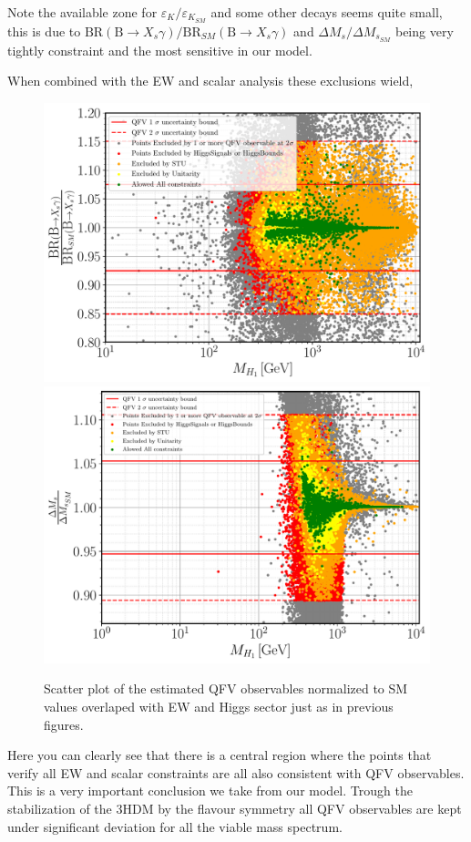 \documentclass[10pt]{book}
\renewcommand{\(}{\left(}
\renewcommand{\)}{\right)}
\renewcommand{\[}{\left[}
\renewcommand{\]}{\right]}
\begin{document}
Note the available zone for $\varepsilon_K/\varepsilon_{K_{SM}}$ and some other decays seems quite small, this is due to ${\textrm{BR} ( \textrm{B} \rightarrow X_s \gamma)}/{\textrm{BR}_{SM} ( \textrm{B} \rightarrow X_s \gamma )}$ and ${\Delta M_s}/{\Delta M_{s_{SM}} }$ being very tightly constraint and the most sensitive in our model.

When combined with the EW and scalar analysis these exclusions wield, 

\begin{figure}[H]
	\centering
	\includegraphics[width=.49\textwidth]{Images/3HDM/PT_Folder/XsGamma_H1.pdf}
    \includegraphics[width=.49\textwidth]{Images/3HDM/PT_Folder/Delta_Ms_H1.pdf}
    \caption{ Scatter plot of the estimated QFV observables normalized to SM values overlaped with EW and Higgs sector just as in previous figures. } 
	\label{fig:3HDM_Flavour_PT}
\end{figure}	

Here you can clearly see that there is a central region where the points that verify all EW and scalar constraints are all also consistent with QFV observables. 
%
This is a very important conclusion we take from our model. Trough the stabilization of the 3HDM by the flavour symmetry all QFV observables are kept under significant deviation for all the viable mass spectrum.  
\end{document}
